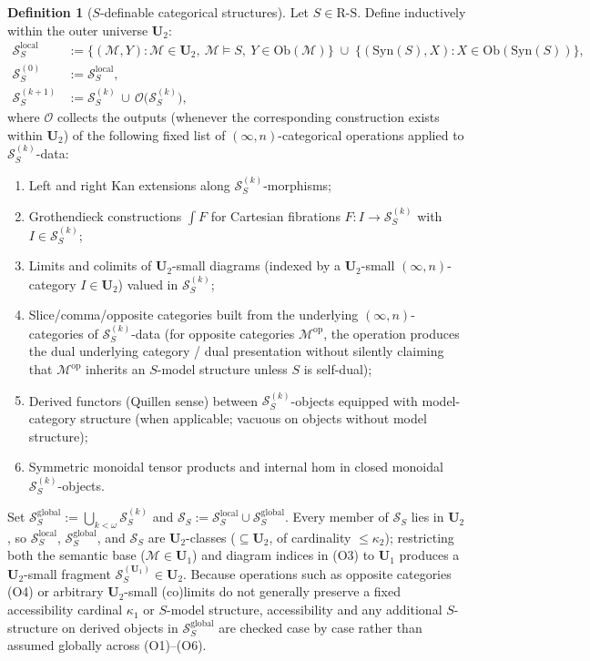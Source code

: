 \documentclass[11pt]{article}
\theoremstyle{plain}
\theoremstyle{definition}
\newtheorem{definition}[theorem]{Definition}
\newcommand{\RS}{\mathrm{R\text{-}S}}
\newcommand{\cS}{\mathcal{S}}
\newcommand{\cM}{\mathcal{M}}
\newcommand{\Ob}{\mathrm{Ob}}
\newcommand{\Syn}{\mathrm{Syn}}
\begin{document}
\begin{definition}[$S$-definable categorical structures]\label{def:SS}
Let $S \in \RS$. Define inductively within the outer universe $\mathbf{U}_2$:
\begin{align*}
\cS_S^{\mathrm{local}} &:= \{(\cM, Y) : \cM \in \mathbf{U}_2,\ \cM \models S,\ Y \in \Ob(\cM)\} \;\cup\; \{(\Syn(S), X) : X \in \Ob(\Syn(S))\}, \\
\cS_S^{(0)} &:= \cS_S^{\mathrm{local}}, \\
\cS_S^{(k+1)} &:= \cS_S^{(k)} \,\cup\, \mathcal{O}\bigl(\cS_S^{(k)}\bigr),
\end{align*}
where $\mathcal{O}$ collects the outputs (whenever the corresponding construction exists within $\mathbf{U}_2$) of the following fixed list of $(\infty, n)$-categorical operations applied to $\cS_S^{(k)}$-data:
\begin{enumerate}[nosep,label=\textrm{(O\arabic*)}]
\item Left and right Kan extensions along $\cS_S^{(k)}$-morphisms;
\item Grothendieck constructions $\int F$ for Cartesian fibrations $F : I \to \cS_S^{(k)}$ with $I \in \cS_S^{(k)}$;
\item Limits and colimits of $\mathbf{U}_2$-small diagrams (indexed by a $\mathbf{U}_2$-small $(\infty, n)$-category $I \in \mathbf{U}_2$) valued in $\cS_S^{(k)}$;
\item Slice/comma/opposite categories built from the underlying $(\infty, n)$-categories of $\cS_S^{(k)}$-data (for opposite categories $\cM^{\mathrm{op}}$, the operation produces the dual underlying category / dual presentation without silently claiming that $\cM^{\mathrm{op}}$ inherits an $S$-model structure unless $S$ is self-dual);
\item Derived functors (Quillen sense) between $\cS_S^{(k)}$-objects equipped with model-category structure (when applicable; vacuous on objects without model structure);
\item Symmetric monoidal tensor products and internal hom in closed monoidal $\cS_S^{(k)}$-objects.
\end{enumerate}
Set $\cS_S^{\mathrm{global}} := \bigcup_{k < \omega} \cS_S^{(k)}$ and $\cS_S := \cS_S^{\mathrm{local}} \cup \cS_S^{\mathrm{global}}$. Every member of $\cS_S$ lies in $\mathbf{U}_2$, so $\cS_S^{\mathrm{local}}$, $\cS_S^{\mathrm{global}}$, and $\cS_S$ are $\mathbf{U}_2$-classes ($\subseteq \mathbf{U}_2$, of cardinality $\le \kappa_2$); restricting both the semantic base ($\cM \in \mathbf{U}_1$) and diagram indices in (O3) to $\mathbf{U}_1$ produces a $\mathbf{U}_2$-small fragment $\cS_S^{(\mathbf{U}_1)} \in \mathbf{U}_2$. Because operations such as opposite categories (O4) or arbitrary $\mathbf{U}_2$-small (co)limits do not generally preserve a fixed accessibility cardinal $\kappa_1$ or $S$-model structure, accessibility and any additional $S$-structure on derived objects in $\cS_S^{\mathrm{global}}$ are checked case by case rather than assumed globally across (O1)--(O6).
\end{definition}
\end{document}
